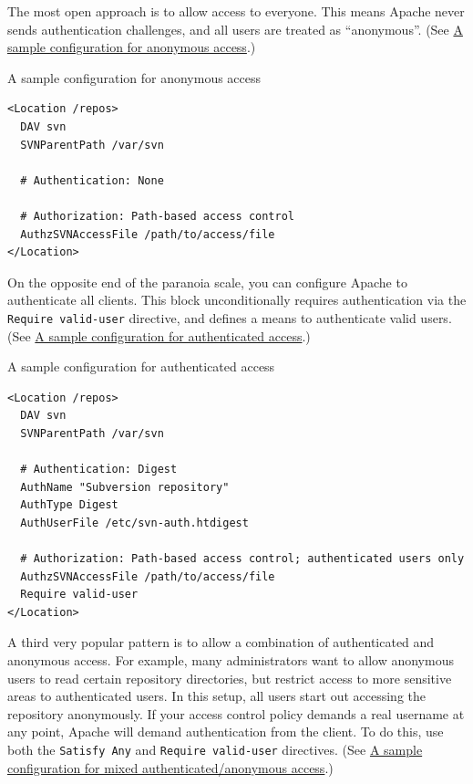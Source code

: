 The most open approach is to allow access to everyone. This means Apache
never sends authentication challenges, and all users are treated as
``anonymous''. (See
\hyperref[svn.serverconfig.httpd.authz.perdir.ex-1]{A sample
configuration for anonymous access}.)

\protect{}\label{svn.serverconfig.httpd.authz.perdir.ex-1}
A sample configuration for anonymous access

\begin{verbatim}
<Location /repos>
  DAV svn
  SVNParentPath /var/svn

  # Authentication: None

  # Authorization: Path-based access control
  AuthzSVNAccessFile /path/to/access/file
</Location>
\end{verbatim}

On the opposite end of the paranoia scale, you can configure Apache to
authenticate all clients. This block unconditionally requires
authentication via the \texttt{Require\ valid-user} directive, and
defines a means to authenticate valid users. (See
\hyperref[svn.serverconfig.httpd.authz.perdir.ex-2]{A sample
configuration for authenticated access}.)

\protect{}\label{svn.serverconfig.httpd.authz.perdir.ex-2}
A sample configuration for authenticated access

\begin{verbatim}
<Location /repos>
  DAV svn
  SVNParentPath /var/svn

  # Authentication: Digest
  AuthName "Subversion repository"
  AuthType Digest
  AuthUserFile /etc/svn-auth.htdigest

  # Authorization: Path-based access control; authenticated users only
  AuthzSVNAccessFile /path/to/access/file
  Require valid-user
</Location>
\end{verbatim}

A third very popular pattern is to allow a combination of authenticated
and anonymous access. For example, many administrators want to allow
anonymous users to read certain repository directories, but restrict
access to more sensitive areas to authenticated users. In this setup,
all users start out accessing the repository anonymously. If your access
control policy demands a real username at any point, Apache will demand
authentication from the client. To do this, use both the
\texttt{Satisfy\ Any} and \texttt{Require\ valid-user} directives. (See
\hyperref[svn.serverconfig.httpd.authz.perdir.ex-3]{A sample
configuration for mixed authenticated/anonymous access}.)

